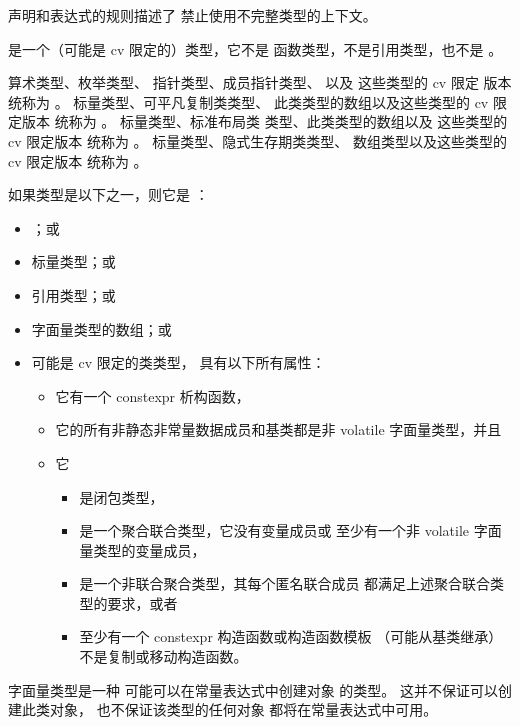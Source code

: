 \pnum
\begin{note}
声明和表达式的规则描述了
禁止使用不完整类型的上下文。
\end{note}

\pnum
\label{term.object.type}%
 是一个（可能是 cv 限定的）类型，它不是
函数类型，不是引用类型，也不是 \cv{} 。

\pnum
{}%
%
%
\label{term.scalar.type}%
算术类型、枚举类型、
指针类型、成员指针类型、
以及
这些类型的 cv 限定 版本
统称为 。
\label{term.trivially.copyable.type}%
标量类型、可平凡复制类类型、
此类类型的数组以及这些类型的 cv 限定版本
统称为 。
\label{term.standard.layout.type}%
标量类型、标准布局类
类型、此类类型的数组以及
这些类型的 cv 限定版本
统称为 。
\label{term.implicit.lifetime.type}%
标量类型、隐式生存期类类型、
数组类型以及这些类型的 cv 限定版本
统称为 。

\pnum
\label{term.literal.type}%
如果类型是以下之一，则它是 ：
\begin{itemize}
\item \cv{} ；或
\item 标量类型；或
\item 引用类型；或
\item 字面量类型的数组；或
\item 可能是 cv 限定的类类型，
具有以下所有属性：
\begin{itemize}
\item 它有一个 constexpr 析构函数，
\item 它的所有非静态非常量数据成员和基类都是非 volatile 字面量类型，并且
\item 它
\begin{itemize}
\item 是闭包类型，
\item 是一个聚合联合类型，它没有变量成员或
至少有一个非 volatile 字面量类型的变量成员，
\item 是一个非联合聚合类型，其每个匿名联合成员
都满足上述聚合联合类型的要求，或者
\item 至少有一个 constexpr 构造函数或构造函数模板
（可能从基类继承）
不是复制或移动构造函数。
\end{itemize}
\end{itemize}
\end{itemize}
\begin{note}
字面量类型是一种
可能可以在常量表达式中创建对象
的类型。
这并不保证可以创建此类对象，
也不保证该类型的任何对象
都将在常量表达式中可用。
\end{note}

